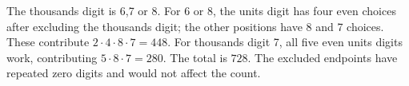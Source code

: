 The thousands digit is 6,7 or 8. For 6 or 8, the units digit has four even choices after excluding the thousands digit; the other positions have 8 and 7 choices. These contribute $2\cdot4\cdot8\cdot7=448$. For thousands digit 7, all five even units digits work, contributing $5\cdot8\cdot7=280$. The total is $\boxed{728}$. The excluded endpoints have repeated zero digits and would not affect the count.
